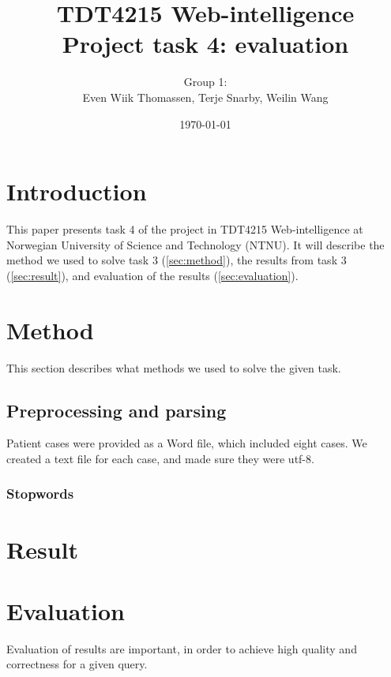 \documentclass[a4paper, 12pt]{article}
\title{TDT4215 Web-intelligence\\Project task 4: evaluation}
\author{Group 1:\\Even Wiik Thomassen, Terje Snarby, Weilin Wang}
\date{\today}
\begin{document}

\maketitle
\tableofcontents


\section{Introduction}
This paper presents task 4 of the project in TDT4215 Web-intelligence at
Norwegian University of Science and Technology (NTNU). It will
describe the method we used to solve task 3 (\autoref{sec:method}),
the results from task 3 (\autoref{sec:result}),
and evaluation of the results (\autoref{sec:evaluation}).


\section{Method}
\label{sec:method}
This section describes what methods we used to solve the given task.

\subsection{Preprocessing and parsing}
Patient cases were provided as a Word file, which included eight cases.
We created a text file for each case, and made sure they were utf-8.



\subsubsection{Stopwords}


\subsection{}


\section{Result}
\label{sec:result}


\section{Evaluation}
\label{sec:evaluation}
Evaluation of results are important, in order to achieve high quality and correctness for a given query.
\end{document}
